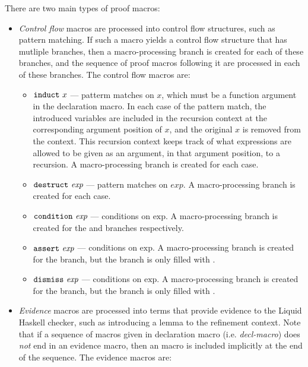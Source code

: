 There are two main types of proof macros: 
\begin{itemize}
  \item
  \textit{Control flow} macros are processed into control flow structures, such as pattern matching. 
  If such a macro yields a control flow structure that has mutliple branches, then a macro-processing branch is created for each of these branches, and the sequence of proof macros following it are processed in each of these branches.
  The control flow macros are:
  \begin{itemize}
    \item
    $\mathtt{induct} ~ x$ --- patterm matches on $x$, which must be a function argument in the declaration macro.
    In each case of the pattern match, the introduced variables are included in the recursion context at the corresponding argument position of $x$, and the original $x$ is removed from the context.
    This recursion context keeps track of what expressions are allowed to be given as an argument, in that argument position, to a recursion.
    A macro-processing branch is created for each case.
    \item 
    $\mathtt{destruct} ~ \textit{exp}$ --- pattern matches on $\textit{exp}$. A macro-processing branch is created for each case.
    \item $\mathtt{condition} ~ \textit{exp}$ --- conditions on $\text{exp}$. A macro-processing branch is created for the  and  branches respectively.
    \item $\mathtt{assert} ~ \textit{exp}$ --- conditions on $\text{exp}$. A macro-processing branch is created for the  branch, but the  branch is only filled with .
    \item $\mathtt{dismiss} ~ \textit{exp}$ --- conditions on $\text{exp}$. A macro-processing branch is created for the  branch, but the  branch is only filled with .
  \end{itemize}
  \item
  \textit{Evidence} macros are processed into terms that provide evidence to the Liquid Haskell checker, such as introducing a lemma to the refinement context.
  Note that if a sequence of macros given in declaration macro (i.e. \textit{decl-macro}) does \textit{not} end in an evidence macro, then an  macro is included implicitly at the end of the sequence.
  The evidence macros are:
  \begin{itemize}

\end{itemize}
\end{itemize}
